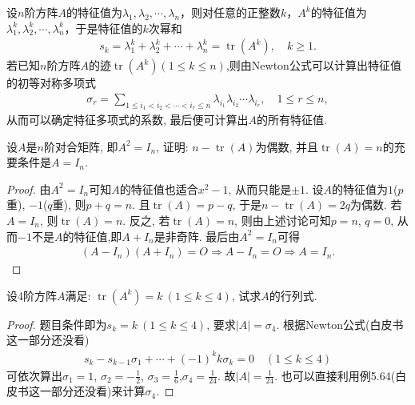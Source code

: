 \documentclass[../../main.tex]{subfiles}
\begin{document}
\begin{conclusion}
设$n$阶方阵$A$的特征值为$\lambda_1, \lambda_2, \cdots, \lambda_n$，则对任意的正整数$k$，$A^k$的特征值为$\lambda_1^k, \lambda_2^k, \cdots, \lambda_n^k$，于是特征值的$k$次幂和
\begin{align*}
s_k = \lambda_1^k + \lambda_2^k + \cdots + \lambda_n^k = \operatorname{tr}(A^k), \quad k \geqslant  1.
\end{align*}
若已知$n$阶方阵$A$的迹$\operatorname{tr}(A^k)(1\leqslant  k \leqslant  n)$,则由Newton公式可以计算出特征值的初等对称多项式
\begin{align*}
\sigma_r = \sum_{1 \leqslant  i_1 < i_2 < \cdots < i_r \leqslant  n} \lambda_{i_1} \lambda_{i_2} \cdots \lambda_{i_r}, \quad 1 \leqslant  r \leqslant  n,
\end{align*}
从而可以确定特征多项式的系数, 最后便可计算出$A$的所有特征值.
\end{conclusion}

\begin{example}
设$A$是$n$阶对合矩阵, 即$A^2 = I_n$, 证明: $n - \operatorname{tr}(A)$为偶数, 并且$\operatorname{tr}(A) = n$的充要条件是$A = I_n$.
\end{example}
\begin{proof}
由$A^2 = I_n$可知$A$的特征值也适合$x^2 - 1$, 从而只能是$\pm 1$. 设$A$的特征值为$1$($p$重), $-1$($q$重), 则$p + q = n$. 且$\operatorname{tr}(A) = p - q$, 于是$n - \operatorname{tr}(A) = 2q$为偶数. 若$A = I_n$, 则$\operatorname{tr}(A) = n$. 反之, 若$\operatorname{tr}(A) = n$, 则由上述讨论可知$p = n$, $q = 0$, 从而$-1$不是$A$的特征值,即$A + I_n$是非奇阵. 最后由$A^2=I_n$可得
\begin{align*}
(A - I_n)(A + I_n) = O\Rightarrow A-I_n=O\Rightarrow A = I_n.
\end{align*}
\end{proof}

\begin{example}
设4阶方阵$A$满足: $\operatorname{tr}(A^k) = k \ (1 \leqslant  k \leqslant  4)$, 试求$A$的行列式.
\end{example}
\begin{proof}
题目条件即为$s_k = k \ (1 \leqslant  k \leqslant  4)$, 要求$\lvert A \rvert = \sigma_4$. 根据Newton公式(白皮书这一部分还没看)
\begin{align*}
s_k - s_{k-1} \sigma_1 + \cdots + (-1)^k k \sigma_k = 0 \quad (1 \leqslant  k \leqslant  4)
\end{align*}
可依次算出$\sigma_1 = 1$, $\sigma_2 = -\frac{1}{2}$, $\sigma_3 = \frac{1}{6}$,$\sigma_4 = \frac{1}{24}.$
故$\lvert A \rvert = \frac{1}{24}$. 也可以直接利用例5.64(白皮书这一部分还没看)来计算$\sigma_4$.
\end{proof}
\end{document}
